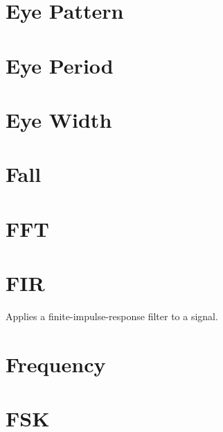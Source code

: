 \section{Eye Pattern}

\pagebreak
\section{Eye Period}

\pagebreak
\section{Eye Width}

\pagebreak
\section{Fall}

\pagebreak
\section{FFT}

\pagebreak
\section{FIR}

Applies a finite-impulse-response filter to a signal.

\pagebreak
\section{Frequency}

\pagebreak
\section{FSK}

